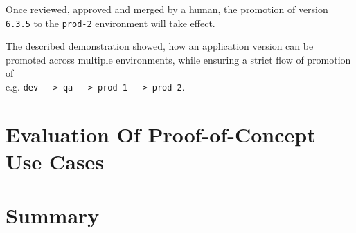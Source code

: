 Once reviewed, approved and merged by a human,
the promotion of version \lstinline|6.3.5| to the \lstinline|prod-2| environment
will take effect.

The described demonstration showed,
how an application version can be promoted across multiple environments,
while ensuring a strict flow of promotion of \\
e.g. \lstinline|dev --> qa --> prod-1 --> prod-2|.


























\section{Evaluation Of Proof-of-Concept Use Cases}











\section{Summary}








